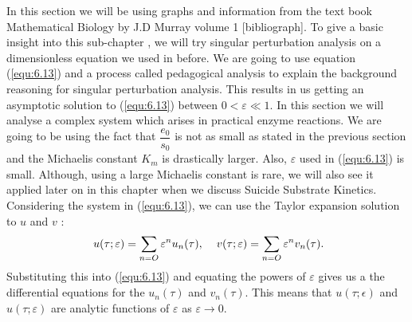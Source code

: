 \documentclass[a4paper]{report}
\theoremstyle{definition}
\begin{document}
In this section we will be using graphs and information from the text book Mathematical Biology by J.D Murray volume 1 [bibliograph]. To give a basic insight into this sub-chapter , we will try singular perturbation analysis on a dimensionless equation we used in before. We are going to use equation (\ref{equ:6.13}) and a process called pedagogical analysis to explain the background reasoning for singular perturbation analysis. This results in us getting an asymptotic solution to (\ref{equ:6.13}) between $0<\varepsilon\ll1$. In this section we will analyse a complex system which arises in practical enzyme reactions. We are going to be using the fact that $\dfrac{{e_{0}}}{{s_{0}}}$ is not as small as stated in the previous section and the Michaelis constant $K_{m}$ is drastically larger. Also, $\varepsilon$ used in (\ref{equ:6.13}) is small. Although, using a large Michaelis constant is rare, we will also see it applied later on in this chapter when we discuss Suicide Substrate Kinetics.\\

Considering the system in (\ref{equ:6.13}), we can use the Taylor expansion solution to $u$ and $v$ :
\begin{align}\label{eq:6.24}
\ u(\tau;\varepsilon)= \sum_{n=O}\varepsilon{^n}u_n(\tau),\hspace{4mm} v(\tau;\varepsilon)= \sum_{n=O}\varepsilon{^n}v_n(\tau).
\end{align}
Substituting this into (\ref{equ:6.13}) and equating the powers of $\varepsilon$  gives us a the differential equations for the $u_n(\tau)$ and $v_n(\tau)$. This means that $u(\tau;\epsilon)$ and $u(\tau;\varepsilon)$ are analytic functions of $\varepsilon$ as $\varepsilon\rightarrow 0$.
\end{document}
